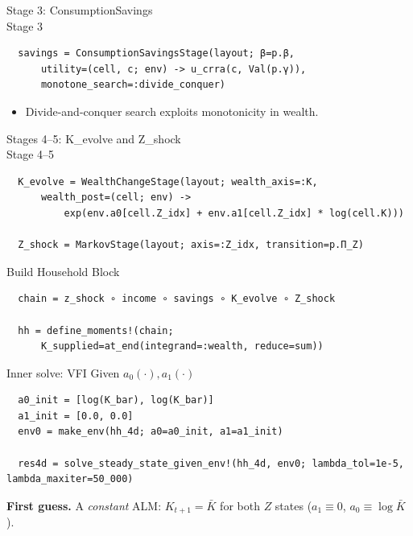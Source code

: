 \documentclass[10pt,aspectratio=169]{beamer}
\begin{document}
\begin{frame}[fragile]{Stage 3: ConsumptionSavings \\ Stage 3}
  \begin{lstlisting}
  savings = ConsumptionSavingsStage(layout; β=p.β,
      utility=(cell, c; env) -> u_crra(c, Val(p.γ)),
      monotone_search=:divide_conquer)
  \end{lstlisting}

  \begin{itemize}
    \item Divide-and-conquer search exploits monotonicity in wealth.
  \end{itemize}
\end{frame}

\begin{frame}[fragile]{Stages 4--5: K\_evolve and Z\_shock \\ Stage 4--5}
  \begin{lstlisting}
  K_evolve = WealthChangeStage(layout; wealth_axis=:K,
      wealth_post=(cell; env) ->
          exp(env.a0[cell.Z_idx] + env.a1[cell.Z_idx] * log(cell.K)))

  Z_shock = MarkovStage(layout; axis=:Z_idx, transition=p.Π_Z)
  \end{lstlisting}
\end{frame}

\begin{frame}[fragile]{Build Household Block}
  \begin{lstlisting}
  chain = z_shock ∘ income ∘ savings ∘ K_evolve ∘ Z_shock

  hh = define_moments!(chain;
      K_supplied=at_end(integrand=:wealth, reduce=sum))
  \end{lstlisting}
\end{frame}

\begin{frame}[fragile]{Inner solve: VFI Given $a_0(\cdot), a_1(\cdot)$}
  \begin{lstlisting}
  a0_init = [log(K_bar), log(K_bar)]
  a1_init = [0.0, 0.0]
  env0 = make_env(hh_4d; a0=a0_init, a1=a1_init)

  res4d = solve_steady_state_given_env!(hh_4d, env0; lambda_tol=1e-5, lambda_maxiter=50_000)
  \end{lstlisting}

  \textbf{First guess.} A \emph{constant} ALM: $K_{t+1} = \bar K$ for both $Z$ states ($a_1 \equiv 0$, $a_0 \equiv \log \bar K$).
\end{frame}
\end{document}
